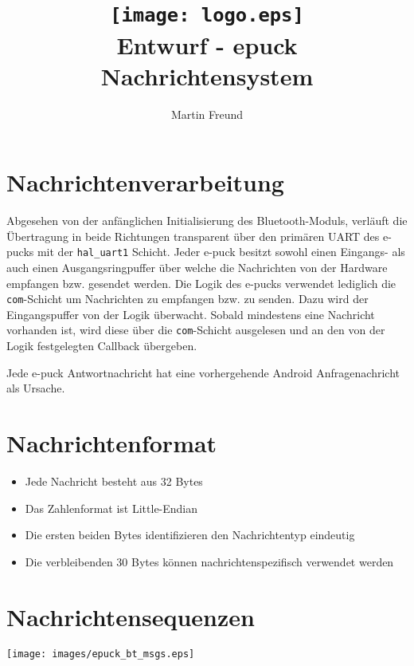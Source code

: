 \documentclass[10pt,a4paper]{article}
\title{
	\texttt{[image: logo.eps]} \\
	\vspace{1cm}
	Entwurf - epuck Nachrichtensystem
}
\author{Martin Freund}
\begin{document}
	\section{Nachrichtenverarbeitung}
		{Abgesehen von der anfänglichen Initialisierung des Bluetooth-Moduls, verläuft die Übertragung in beide
		Richtungen transparent über den primären UART des e-pucks mit der {\tt hal\_uart1} Schicht. Jeder e-puck besitzt
		sowohl einen Eingangs- als auch	einen Ausgangsringpuffer über welche die Nachrichten von der Hardware empfangen
		bzw. gesendet werden. Die Logik des e-pucks verwendet lediglich die {\tt com}-Schicht um Nachrichten zu
		empfangen bzw. zu senden. Dazu wird der Eingangspuffer von der Logik überwacht. Sobald mindestens eine Nachricht
		vorhanden ist, wird diese über die	{\tt com}-Schicht ausgelesen und an den von der Logik festgelegten Callback
		übergeben.

		Jede e-puck Antwortnachricht hat eine vorhergehende Android Anfragenachricht als Ursache.}
	\section{Nachrichtenformat}
		\begin{itemize}
			\item Jede Nachricht besteht aus 32 Bytes
			\item Das Zahlenformat ist Little-Endian
			\item Die ersten beiden Bytes identifizieren den Nachrichtentyp eindeutig
			\item Die verbleibenden 30 Bytes können nachrichtenspezifisch verwendet werden
		\end{itemize}
	\section{Nachrichtensequenzen}	
		\texttt{[image: images/epuck\_bt\_msgs.eps]}
\end{document}
